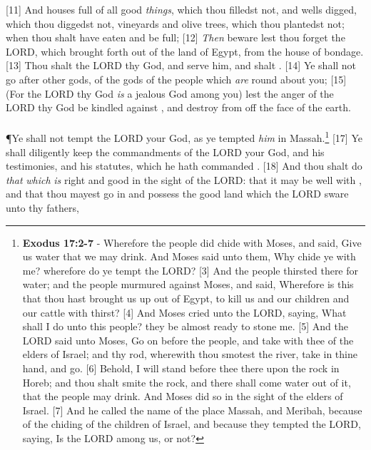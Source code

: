 [11] \textcolor[cmyk]{0.99998,1,0,0}{And houses full of all good \emph{things}, which thou filledst not, and wells digged, which thou diggedst not, vineyards and olive trees, which thou plantedst not; when thou shalt have eaten and be full;}
[12] \textcolor[cmyk]{0.99998,1,0,0}{\emph{Then} beware lest thou forget the LORD, which brought   forth out of the land of Egypt, from the house of bondage.}
[13] \textcolor[cmyk]{0.99998,1,0,0}{Thou shalt  the LORD thy God, and serve him, and shalt .}
[14] \textcolor[cmyk]{0.99998,1,0,0}{Ye shall not go after other gods, of the gods of the people which \emph{are} round about you;}
[15] \textcolor[cmyk]{0.99998,1,0,0}{(For the LORD thy God \emph{is} a jealous God among you) lest the anger of the LORD thy God be kindled against  , and destroy   from off the face of the earth.}\\
\\
\P \textcolor[cmyk]{0.99998,1,0,0}{Ye shall not tempt the LORD your God, as ye tempted \emph{him} in Massah.}\footnote{\textbf{Exodus 17:2-7} - Wherefore the people did chide with Moses, and said, Give us water that we may drink. And Moses said unto them, Why chide ye with me? wherefore do ye tempt the LORD? [3] And the people thirsted there for water; and the people murmured against Moses, and said, Wherefore is this that thou hast brought us up out of Egypt, to kill us and our children and our cattle with thirst? [4] And Moses cried unto the LORD, saying, What shall I do unto this people? they be almost ready to stone me. [5] And the LORD said unto Moses, Go on before the people, and take with thee of the elders of Israel; and thy rod, wherewith thou smotest the river, take in thine hand, and go. [6] Behold, I will stand before thee there upon the rock in Horeb; and thou shalt smite the rock, and there shall come water out of it, that the people may drink. And Moses did so in the sight of the elders of Israel. [7] And he called the name of the place Massah, and Meribah, because of the chiding of the children of Israel, and because they tempted the LORD, saying, Is the LORD among us, or not?}
[17] \textcolor[cmyk]{0.99998,1,0,0}{Ye shall diligently keep the commandments of the LORD your God, and his testimonies, and his statutes, which he hath commanded  .}
[18] \textcolor[cmyk]{0.99998,1,0,0}{And thou shalt do \emph{that} \emph{which} \emph{is} right and good in the sight of the LORD: that it may be well with  , and that thou mayest go in and possess the good land which the LORD sware unto thy fathers,}

